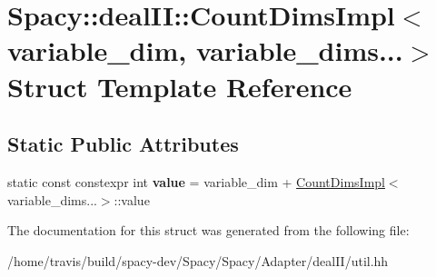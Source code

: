 \hypertarget{structSpacy_1_1dealII_1_1CountDimsImpl_3_01variable__dim_00_01variable__dims_8_8_8_4}{\section{Spacy\-:\-:deal\-I\-I\-:\-:Count\-Dims\-Impl$<$ variable\-\_\-dim, variable\-\_\-dims...$>$ Struct Template Reference}
\label{structSpacy_1_1dealII_1_1CountDimsImpl_3_01variable__dim_00_01variable__dims_8_8_8_4}
}
\subsection*{Static Public Attributes}
\begin{DoxyCompactItemize}
\item 
\hypertarget{structSpacy_1_1dealII_1_1CountDimsImpl_3_01variable__dim_00_01variable__dims_8_8_8_4_aa8976e0e85ece6ef8cf929b0e1fcb58c}{static const constexpr int {\bfseries value} = variable\-\_\-dim + \hyperlink{structSpacy_1_1dealII_1_1CountDimsImpl}{Count\-Dims\-Impl}$<$variable\-\_\-dims...$>$\-::value}\label{structSpacy_1_1dealII_1_1CountDimsImpl_3_01variable__dim_00_01variable__dims_8_8_8_4_aa8976e0e85ece6ef8cf929b0e1fcb58c}

\end{DoxyCompactItemize}


The documentation for this struct was generated from the following file\-:\begin{DoxyCompactItemize}
\item 
/home/travis/build/spacy-\/dev/\-Spacy/\-Spacy/\-Adapter/deal\-I\-I/util.\-hh\end{DoxyCompactItemize}
